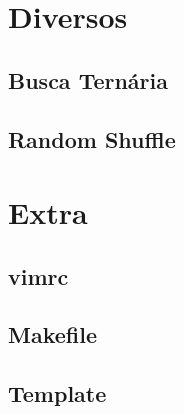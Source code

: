 \documentclass[12pt, a4paper, twoside]{article}
\begin{document}
\newpage

%
%

\section{Diversos}

\subsection{Busca Ternária}


\newpage

\subsection{Random Shuffle}


\newpage

%
%

\section{Extra}

\subsection{vimrc}


\subsection{Makefile}


\newpage

\subsection{Template}

\end{document}

